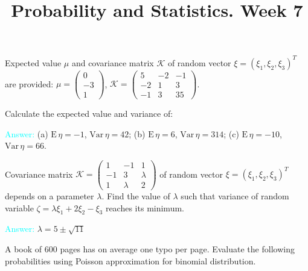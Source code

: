 \documentclass[14pt]{exam}
\title{Probability and Statistics. Week 7}
\date{}
\def\Var{{\textrm{Var}}\,}
\def\E{{\textrm{E}}\,}
\begin{document}
	\maketitle
	
	
	\begin{questions}
		
		\question
		Expected value $\mu$ and covariance matrix $\mathcal{K}$ of random vector $\xi = (\xi_1, \xi_2, \xi_3)^T$ are provided: $\mu = \begin{pmatrix}
			0\\-3\\1
		\end{pmatrix}$, $\mathcal{K} = \begin{pmatrix}
			5 & -2 & -1\\
			-2 & 1 & 3\\
			-1 & 3 & 35
		\end{pmatrix}$.
		
		Calculate the expected value and variance of:
		
		\textcolor{cyan}{Answer:} (a) $\E\eta = -1$, $\Var\eta=42$; (b) $\E\eta = 6$, $\Var\eta = 314$; (c) $\E\eta = -10$, $\Var\eta = 66$.
		
		\question
		Covariance matrix $\mathcal{K} = \begin{pmatrix}
			1 & -1 & 1\\
			-1 & 3& \lambda\\
			1 & \lambda & 2
		\end{pmatrix}$
		of random vector $\xi = (\xi_1, \xi_2, \xi_3)^T$ depends on a parameter $\lambda$. Find the value of $\lambda$ such that variance of random variable $\zeta = \lambda\xi_1 + 2\xi_2 -\xi_3$ reaches its minimum.
		
		\textcolor{cyan}{Answer:} $\lambda = 5 \pm \sqrt{11}$
		
		\question
		A book of 600 pages  has on average one typo per page. Evaluate the following probabilities using Poisson approximation for binomial distribution.
		

\end{questions}
\end{document}
